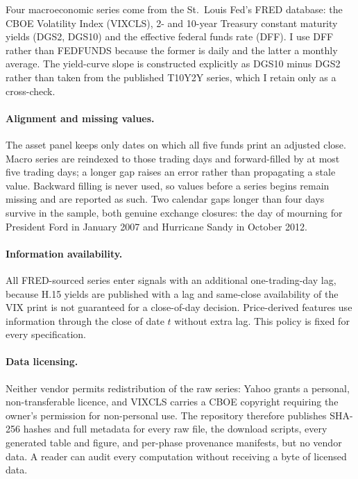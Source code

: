 \documentclass[11pt,letterpaper]{article}
\begin{document}
Four macroeconomic series come from the St.\ Louis Fed's FRED database:
the CBOE Volatility Index (VIXCLS), 2- and 10-year Treasury constant
maturity yields (DGS2, DGS10) and the effective federal funds rate
(DFF). I use DFF rather than FEDFUNDS because the former is daily and
the latter a monthly average. The yield-curve slope is constructed
explicitly as DGS10 minus DGS2 rather than taken from the published
T10Y2Y series, which I retain only as a cross-check.

\paragraph{Alignment and missing values.} The asset panel keeps only
dates on which all five funds print an adjusted close. Macro series are
reindexed to those trading days and forward-filled by at most five
trading days; a longer gap raises an error rather than propagating a
stale value. Backward filling is never used, so values before a series
begins remain missing and are reported as such. Two calendar gaps
longer than four days survive in the sample, both genuine exchange
closures: the day of mourning for President Ford in January 2007 and
Hurricane Sandy in October 2012.

\paragraph{Information availability.} All FRED-sourced series enter
signals with an additional one-trading-day lag, because H.15 yields are
published with a lag and same-close availability of the VIX print is not
guaranteed for a close-of-day decision. Price-derived features use
information through the close of date $t$ without extra lag. This policy
is fixed for every specification.

\paragraph{Data licensing.} Neither vendor permits redistribution of the
raw series: Yahoo grants a personal, non-transferable licence, and
VIXCLS carries a CBOE copyright requiring the owner's permission for
non-personal use. The repository therefore publishes SHA-256 hashes and
full metadata for every raw file, the download scripts, every generated
table and figure, and per-phase provenance manifests, but no vendor
data. A reader can audit every computation without receiving a byte of
licensed data.

\end{document}
